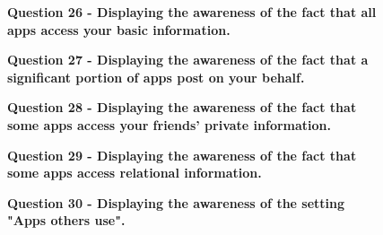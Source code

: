 \begin{figure}[h!]
\centering
{}
\caption[Question 26 - Displaying the awareness of the fact that all apps access your basic information]{\textbf{Question 26 - Displaying the awareness of the fact that all apps access your basic information.}} 
\label{fig:appsaccessbasicinfo}
\end{figure}

\begin{figure}[h!]
\centering
{}
\caption[Question 27 - Displaying the awareness of the fact that a significant portion of apps post on your behalf]{\textbf{Question 27 - Displaying the awareness of the fact that a significant portion of apps post on your behalf.}} 
\label{fig:appspostonyourbehalf}
\end{figure}

\begin{figure}[h!]
\centering
{}
\caption[Question 28 - Displaying the awareness of the fact that some apps access your friends' private information]{\textbf{Question 28 - Displaying the awareness of the fact that some apps access your friends' private information.}} 
\label{fig:appsaccesstofriendsinfo}
\end{figure}

\begin{figure}[h!]
\centering
{}
\caption[Question 29 - Displaying the awareness of the fact that some apps access relational information]{\textbf{Question 29 - Displaying the awareness of the fact that some apps access relational information.}} 
\label{fig:appsaccessrelationalinfo}
\end{figure}

\begin{figure}[h!]
\centering
{}
\caption[Question 30 - Displaying the awareness of the setting "Apps others use"]{\textbf{Question 30 - Displaying the awareness of the setting "Apps others use".}} 
\label{fig:appsothersuse}
\end{figure}

